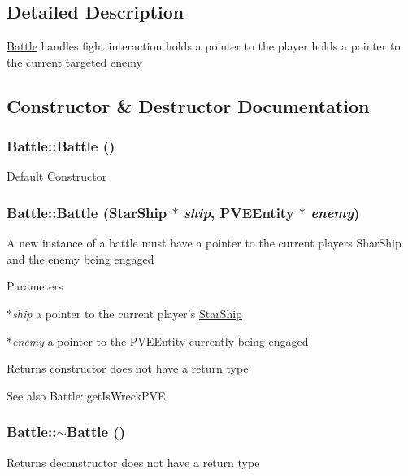 \subsection{Detailed Description}
\hyperlink{classBattle}{Battle} handles fight interaction holds a pointer to the player holds a pointer to the current targeted enemy 

\subsection{Constructor \& Destructor Documentation}
\hypertarget{classBattle_abecc253b23b71da260445e4bdc8522e2}{
\subsubsection[{Battle}]{\setlength{\rightskip}{0pt plus 5cm}Battle::Battle ()}}
\label{dd/dfd/classBattle_abecc253b23b71da260445e4bdc8522e2}
Default Constructor \hypertarget{classBattle_a46d700ea31d3be9e3c2b7f58a361490e}{
\subsubsection[{Battle}]{\setlength{\rightskip}{0pt plus 5cm}Battle::Battle ({\bf StarShip} $\ast$ {\em ship}, \/  {\bf PVEEntity} $\ast$ {\em enemy})}}
\label{dd/dfd/classBattle_a46d700ea31d3be9e3c2b7f58a361490e}
A new instance of a battle must have a pointer to the current players SharShip and the enemy being engaged


\begin{DoxyParams}{Parameters}
\item[{\em $\ast$ship}]a pointer to the current player's \hyperlink{classStarShip}{StarShip} \item[{\em $\ast$enemy}]a pointer to the \hyperlink{classPVEEntity}{PVEEntity} currently being engaged \end{DoxyParams}
\begin{DoxyReturn}{Returns}
constructor does not have a return type 
\end{DoxyReturn}
\begin{DoxySeeAlso}{See also}
Battle::getIsWreckPVE 
\end{DoxySeeAlso}
\hypertarget{classBattle_ae44141e587836ba84243cad46b17c228}{
\subsubsection[{$\sim$Battle}]{\setlength{\rightskip}{0pt plus 5cm}Battle::$\sim$Battle ()}}
\label{dd/dfd/classBattle_ae44141e587836ba84243cad46b17c228}
\begin{DoxyReturn}{Returns}
deconstructor does not have a return type 
\end{DoxyReturn}


